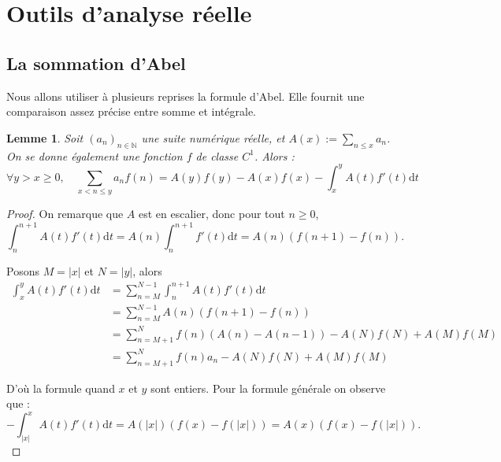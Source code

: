 \documentclass[french]{report}
\newtheorem{lemma}[theorem]{Lemme}
\begin{document}
\section{Outils d'analyse réelle}

\subsection{La sommation d'Abel}

Nous allons utiliser à plusieurs reprises la formule d'Abel. Elle fournit une comparaison assez précise entre somme et intégrale.

\begin{lemma}\label{lem:formule-abel}
  Soit $(a_n)_{n\in\mathbb{N}}$ une suite numérique réelle, et $A(x):=\sum_{n\leq x}a_n$. On se donne également une fonction $f$ de classe $C^1$. Alors :
  \[ \forall y>x\geq0,\quad
  \sum_{x<n\leq y} a_n f(n)
  = A(y)f(y) - A(x)f(x)
  - \int_x^yA(t)f'(t)\mathrm{d}t
  \]
\end{lemma}

\begin{proof}
  On remarque que $A$ est en escalier, donc pour tout $n\geq0$,
  \[ \int_n^{n+1}A(t)f'(t)\mathrm{d}t
  = A(n)\int_n^{n+1}f'(t)\mathrm{d}t
  = A(n)(f(n+1)-f(n)).
  \]

  Posons $M=|x|$ et $N=|y|$, alors
  \begin{align*}
    \int_x^yA(t)f'(t)\mathrm{d}t
    &= \sum_{n=M}^{N-1}\int_n^{n+1}A(t)f'(t)\mathrm{d}t \\
    &= \sum_{n=M}^{N-1}A(n)(f(n+1)-f(n)) \\
    &= \sum_{n=M+1}^Nf(n)(A(n)-A(n-1))-A(N)f(N)+A(M)f(M) \\
    &= \sum_{n=M+1}^Nf(n)a_n-A(N)f(N)+A(M)f(M)
  \end{align*}

  D'où la formule quand $x$ et $y$ sont entiers. Pour la formule générale on observe que :
  \[ -\int_{|x|}^xA(t)f'(t)\mathrm{d}t = A(|x|)(f(x)-f(|x|)) = A(x)(f(x)-f(|x|)). \]
  
\end{proof}
\end{document}
